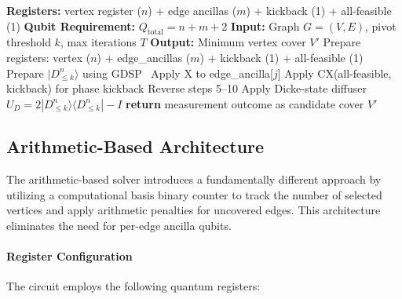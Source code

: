 \documentclass{ieeeaccess}
\begin{document}
\begin{algorithm}[htbp]
\caption{Dicke-State Architecture}
\label{algo:dicke_state}
\begin{algorithmic}[1]
\STATE \textbf{Registers:} vertex register ($n$) + edge
ancillas ($m$) + kickback (1) + all-feasible (1)
\STATE \textbf{Qubit Requirement:} $Q_{\mathrm{total}} = n + m + 2$
\STATE \textbf{Input:} Graph $G=(V,E)$, pivot threshold $k$,
max iterations $T$
\STATE \textbf{Output:} Minimum vertex cover $V'$
\STATE Prepare registers: vertex ($n$) + edge\_ancillas ($m$)
+ kickback (1) + all-feasible (1)
\STATE Prepare $|D_{\leq k}^n\rangle$ using GDSP~\cite{narisada_concrete_2023}
    \STATE {}
            \STATE Apply X to edge\_ancilla[$j$]
        \ENDIF
    \ENDFOR
        \STATE Apply CX(all-feasible, kickback) for phase kickback
    \ENDIF
    \STATE {}
    \STATE Reverse steps 5--10
    \STATE {}
    \STATE Apply Dicke-state diffuser
    $U_D = 2|D_{\leq k}^n\rangle\langle D_{\leq k}^n| - I$
\ENDFOR
\STATE \textbf{return} measurement outcome as candidate cover $V'$
\end{algorithmic}
\end{algorithm}

\subsection{Arithmetic-Based Architecture}

The arithmetic-based solver introduces a fundamentally
different approach by utilizing a computational basis binary
counter to track the number of selected vertices and apply
arithmetic penalties for uncovered edges. This architecture
eliminates the need for per-edge ancilla qubits.

\paragraph{Register Configuration}
The circuit employs the following quantum registers:
\end{document}
